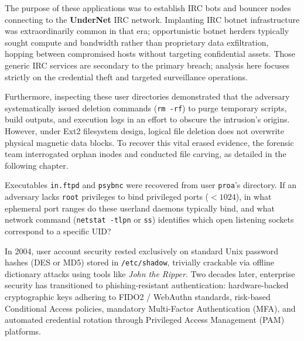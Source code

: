 \vspace{1em}

 The purpose of these applications was to establish IRC bots and bouncer nodes connecting to the \textbf{UnderNet} IRC network. Implanting IRC botnet infrastructure was extraordinarily common in that era; opportunistic botnet herders typically sought compute and bandwidth rather than proprietary data exfiltration, hopping between compromised hosts without targeting confidential assets. Those generic IRC services are secondary to the primary breach; analysis here focuses strictly on the credential theft and targeted surveillance operations.

Furthermore, inspecting these user directories demonstrated that the adversary systematically issued deletion commands (\texttt{rm -rf}) to purge temporary scripts, build outputs, and execution logs in an effort to obscure the intrusion's origins. However, under Ext2 filesystem design, logical file deletion does not overwrite physical magnetic data blocks. To recover this vital erased evidence, the forensic team interrogated orphan inodes and conducted file carving, as detailed in the following chapter.

\begin{retoforense}
Executables \texttt{in.ftpd} and \texttt{psybnc} were recovered from user \texttt{proa}'s directory. If an adversary lacks \texttt{root} privileges to bind privileged ports ($< 1024$), in what ephemeral port ranges do these userland daemons typically bind, and what network command (\texttt{netstat -tlpn} or \texttt{ss}) identifies which open listening sockets correspond to a specific UID?
\end{retoforense}

\begin{perspectiva20}
In 2004, user account security rested exclusively on standard Unix password hashes (DES or MD5) stored in \texttt{/etc/shadow}, trivially crackable via offline dictionary attacks using tools like \textit{John the Ripper}. Two decades later, enterprise security has transitioned to phishing-resistant authentication: hardware-backed cryptographic keys adhering to FIDO2 / WebAuthn standards, risk-based Conditional Access policies, mandatory Multi-Factor Authentication (MFA), and automated credential rotation through Privileged Access Management (PAM) platforms.
\end{perspectiva20}


